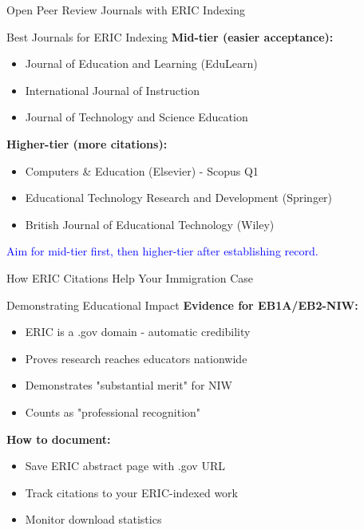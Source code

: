 \documentclass[11pt]{beamer}
\begin{document}
	\begin{frame}{Open Peer Review Journals with ERIC Indexing}
		\small
		\begin{block}{Best Journals for ERIC Indexing}
			\textbf{Mid-tier (easier acceptance):}
			\begin{itemize}
				\item Journal of Education and Learning (EduLearn)
				\item International Journal of Instruction
				\item Journal of Technology and Science Education
			\end{itemize}
			\textbf{Higher-tier (more citations):}
			\begin{itemize}
				\item Computers \& Education (Elsevier) - Scopus Q1
				\item Educational Technology Research and Development (Springer)
				\item British Journal of Educational Technology (Wiley)
			\end{itemize}
			\textcolor{blue}{Aim for mid-tier first, then higher-tier after establishing record.}
		\end{block}
	\end{frame}
	
	\begin{frame}{How ERIC Citations Help Your Immigration Case}
		\small
		\begin{block}{Demonstrating Educational Impact}
			\textbf{Evidence for EB1A/EB2-NIW:}
			\begin{itemize}
				\item ERIC is a .gov domain - automatic credibility
				\item Proves research reaches educators nationwide
				\item Demonstrates "substantial merit" for NIW
				\item Counts as "professional recognition"
			\end{itemize}
			\textbf{How to document:}
			\begin{itemize}
				\item Save ERIC abstract page with .gov URL
				\item Track citations to your ERIC-indexed work
				\item Monitor download statistics
			\end{itemize}
		\end{block}
	\end{frame}
	
\end{document}
